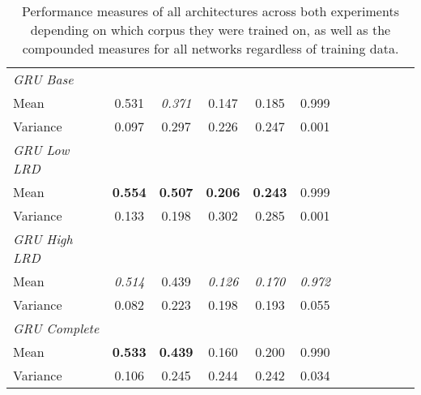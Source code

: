 \begin{table}
\begin{tabularx}{\textwidth}{@{}l*{10}{C}c@{}}
 \midrule
 \midrule
 \textit{GRU Base} \\
 Mean & 0.531 & \textit{0.371} & 0.147 & 0.185 & 0.999 \\
Variance & 0.097 & 0.297 & 0.226 & 0.247 & 0.001 \\
 \midrule
 \textit{GRU Low LRD} \\
 Mean & \textbf{0.554} & \textbf{0.507} & \textbf{0.206} & \textbf{0.243} & 0.999 \\
Variance & 0.133 & 0.198 & 0.302 & 0.285 & 0.001 \\
 \midrule
 \textit{GRU High LRD} \\
 Mean & \textit{0.514} & 0.439 & \textit{0.126} & \textit{0.170} & \textit{0.972} \\
Variance & 0.082 & 0.223 & 0.198 & 0.193 & 0.055 \\
 \midrule
 \textit{GRU Complete} \\
Mean & \textbf{0.533} & \textbf{0.439} & 0.160 & 0.200 & 0.990 \\
Variance & 0.106 & 0.245 & 0.244 & 0.242 & 0.034 \\
\bottomrule
\end{tabularx}
\caption[Performance measures for all networks]{Performance measures of all architectures across both experiments depending on which corpus they were trained on, as well as the compounded measures for all networks regardless of training data.}
\label{tab:perf_all}
\end{table}